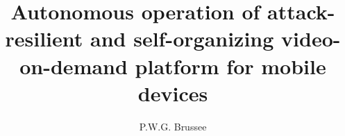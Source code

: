 \documentclass[whitelogo]{tudelft-report}
\begin{document}
\frontmatter

\title[tudelft-white]{Autonomous operation of attack-resilient and self-organizing video-on-demand  platform for mobile devices}
\author[tudelft-white]{P.W.G. Brussee}

%







\tableofcontents

\mainmatter

%







\appendix

%


	
\end{document}
